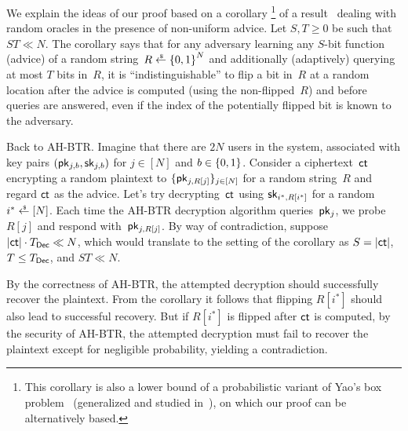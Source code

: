 We explain the ideas of our proof based on a corollary%
\footnote{This corollary is also a lower bound of a probabilistic variant of Yao's box problem~\cite{STOC:Yao90} (generalized and studied in~\cite{EC:CorHenKog22}), on which our proof can be alternatively based.
}
of a result~\cite{C:Unruh07} dealing with random oracles in the presence of non-uniform advice.
Let ${S,T\geq 0}$ be such that ${ST\ll N}$.
The corollary says that
for any adversary learning any $S$-bit function (advice) of a random string~${R\draws\bit^N}$ and additionally (adaptively) querying at most $T$ bits in~$R$,
it is ``indistinguishable'' to flip a bit in~$R$ at a random location
after the advice is computed (using the non-flipped~$R$) and
before queries are answered,
even if the index of the potentially flipped bit is known to the adversary.

Back to AH-BTR. Imagine that there are $2N$ users in the system, associated with key pairs $(\pk_{j,b},\sk_{j,b})$ for ${j\in[N]}$ and ${b\in{\{0,1\}}}$.
Consider a ciphertext~$\ct$ encrypting a random plaintext to $\{\pk_{j,R[j]}\}_{j\in[N]}$ for a random string~$R$ and
regard $\ct$ as the advice.
Let's try decrypting~$\ct$ using $\sk_{i^\ast,R[i^\ast]}$ for a random ${i^\ast\draws[N]}$.
Each time the AH-BTR decryption algorithm queries~$\pk_j$,
we probe $R[j]$ and respond with~$\pk_{j,R[j]}$.
By way of contradiction, suppose ${|\ct|\cdot\TDec\ll N}$,
which would translate to the setting of the corollary as ${S=|\ct|}$, ${T\leq\TDec}$, and ${ST\ll N}$.

By the correctness of AH-BTR,
the attempted decryption should successfully recover the plaintext.
From the corollary it follows that flipping $R[i^\ast]$ should also lead to successful recovery.
But if $R[i^\ast]$ is flipped after $\ct$ is computed,
by the security of AH-BTR,
the attempted decryption must fail to recover the plaintext except for negligible probability, yielding a contradiction.
